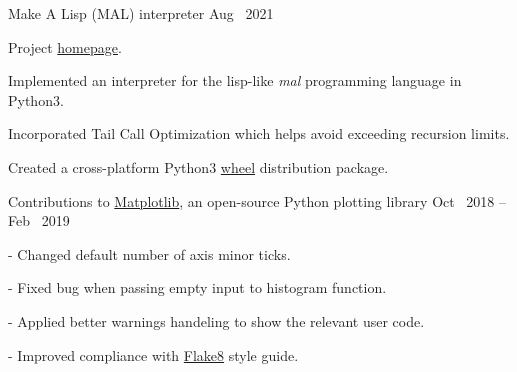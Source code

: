

\begin{cventries}

  \cventryWithTags
  {Make A Lisp (MAL) interpreter} %
    {} %
    {} %
    {Aug \ 2021} %
    { }
    {
      \begin{cvitems} %
        \hypersetup{urlcolor=blue}
      \item Project \href{https://github.com/hershen/mal/tree/master/impls/myPython}{homepage}.
      \item Implemented an interpreter for the lisp-like \emph{mal} programming language in Python3.
      \item Incorporated Tail Call Optimization which helps avoid exceeding recursion limits.
      \item Created a cross-platform Python3 \href{https://pypi.org/project/mal-python}{wheel} distribution package.
      \end{cvitems}
    }

  
    \cventryWithTags
    {Contributions to \hypersetup{urlcolor=blue}\href{https://www.github.com/matplotlib/matplotlib}{Matplotlib}, an open-source Python plotting library} %
    {} %
    {} %
    {Oct \ 2018 -- Feb \ 2019} %
    { }
    {
      \begin{cvitems}
        \hypersetup{urlcolor=blue}
      \item {} - Changed default number of axis minor ticks.
      \item {} - Fixed bug when passing empty input to histogram function.
      \item {} - Applied better warnings handeling to show the relevant user code.
      \item {} - Improved compliance with \href{https://flake8.pycqa.org/en/latest}{Flake8} style guide.
      \end{cvitems}
    }

  \end{cventries}
